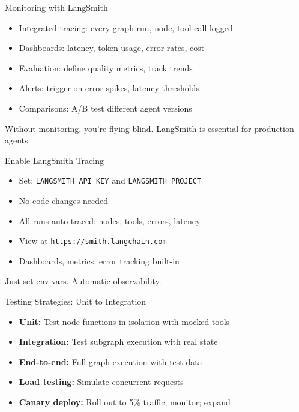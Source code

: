 \documentclass[aspectratio=169,11pt]{beamer}
\begin{document}
\begin{frame}{Monitoring with LangSmith}
\setlength{\itemsep}{1pt}
\begin{itemize}
\item Integrated tracing: every graph run, node, tool call logged
\item Dashboards: latency, token usage, error rates, cost
\item Evaluation: define quality metrics, track trends
\item Alerts: trigger on error spikes, latency thresholds
\item Comparisons: A/B test different agent versions
\end{itemize}
\vspace{0.15cm}
\begin{conceptbox}[Observability]
Without monitoring, you're flying blind. LangSmith is essential for production agents.
\end{conceptbox}
\end{frame}

\begin{frame}{Enable LangSmith Tracing}
\setlength{\itemsep}{1pt}
\begin{itemize}
\item Set: \texttt{LANGSMITH\_API\_KEY} and \texttt{LANGSMITH\_PROJECT}
\item No code changes needed
\item All runs auto-traced: nodes, tools, errors, latency
\item View at \texttt{https://smith.langchain.com}
\item Dashboards, metrics, error tracking built-in
\end{itemize}
\vspace{0.1cm}
\begin{tipbox}
Just set env vars. Automatic observability.
\end{tipbox}
\end{frame}

\begin{frame}{Testing Strategies: Unit to Integration}
\setlength{\itemsep}{1pt}
\begin{itemize}
\item \textbf{Unit:} Test node functions in isolation with mocked tools
\item \textbf{Integration:} Test subgraph execution with real state
\item \textbf{End-to-end:} Full graph execution with test data
\item \textbf{Load testing:} Simulate concurrent requests
\item \textbf{Canary deploy:} Roll out to 5\% traffic; monitor; expand
\end{itemize}
\vspace{0.15cm}
\begin{tipbox}[Pyramid}
Many unit tests, fewer integration tests, few full end-to-end tests.
\end{tipbox}
\end{frame}
\end{document}
